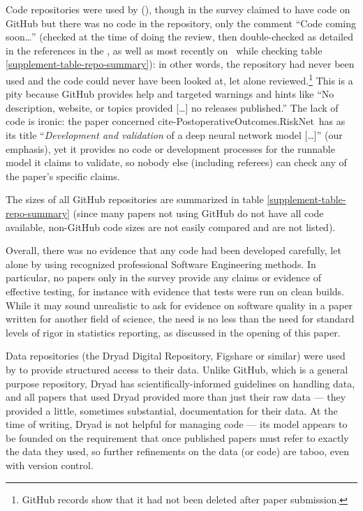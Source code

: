 \documentclass[10pt,a4paper]{article}
\begin{document}
Code repositories were used by  (\pc{\countUsesVersionControlRepository}{\dataN}), though  in the survey claimed to have code on GitHub but there was no code in the repository, only the comment ``Code coming soon\ldots'' (checked at the time of doing the review, then double-checked as detailed in the references in the \supplement, as well as most recently on \clonedate\
while checking table \ref{supplement-table-repo-summary}): in other words, the repository had never been used and the code could never have been looked at, let alone reviewed.\footnote{GitHub records show that it had not been deleted after paper submission.} This is a pity because GitHub provides help and targeted warnings and hints like ``No description, website, or topics provided [\ldots] no releases published.'' The lack of code is ironic: the paper concerned \csname cite-PostoperativeOutcomes.RiskNet\endcsname\ has as its title ``\emph{Development and validation\/} of a deep neural network model [\ldots]'' (our emphasis), yet it provides no code or development processes for the runnable model it claims to validate, so nobody else (including referees) can check any of the paper's specific claims.

The sizes of all GitHub repositories are summarized in table \ref{supplement-table-repo-summary} (since many papers not using GitHub do not have all code available, non-GitHub code sizes are not easily compared and are not listed). 

Overall, there was no evidence that any code had been developed carefully, let alone by using recognized professional Software Engineering methods. In particular, 
\ifnum \countCodetested=0
no papers
\else only 
\fi in the survey provide any claims or evidence of effective testing, for instance with evidence that tests were run on clean builds. {While it may sound unrealistic to ask for evidence on software quality in a paper written for another field of science, the need is no less than the need for standard levels of rigor in statistics reporting, as discussed in the opening of this paper.}

Data repositories (the Dryad Digital Repository, Figshare or similar) were used by  to provide structured access to their data. Unlike GitHub, which is a general purpose repository, Dryad has scientifically-informed guidelines on handling data, and all papers that used Dryad provided more than just their raw data --- they provided a little, sometimes substantial, documentation for their data. At the time of writing, Dryad is not helpful for managing code --- its model appears to be founded on the requirement that once published papers must refer to exactly the data they used, so further refinements on the data (or code) are taboo, even with version control.
\end{document}
